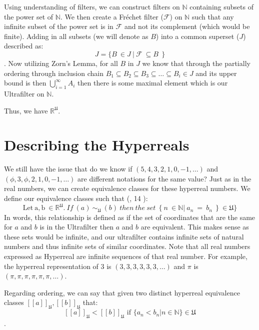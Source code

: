 \documentclass[12pt]{report}
\newcommand{\R}{\mathbb{R}}
\newcommand{\N}{\mathbb{N}}
\newcommand{\U}{\mathfrak{U}}
\begin{document}
Using understanding of filters, we can construct filters on $\N$ containing subsets of the power set of $\N$.
We then create a Fr\'echet filter ($\mathcal{F}$) on $\N$ such that any infinite subset of the power set is in $\mathcal{F}$ and not its complement (which would be finite).
Adding in all subsets (we will denote as $B$) into a common superset ($J$) described as:\[J=\{B\ \in J\ |\ \mathcal{F}\ \subseteq B\ \ \}\].
Now utilizing Zorn's Lemma, for all $B$ in $J$ we know that through the partially ordering through inclusion chain $B_1\subseteq B_2\subseteq B_3\subseteq\ldots\subseteq B_i\in J $ and its upper bound is then $\bigcup_{i=1}^{\infty}A_i$ then there is some maximal element which is our Ultrafilter on $\N$.

Thus, we have $\R^{\mathfrak{U}} $.


\chapter{ Describing the Hyperreals}
We still have the issue that do we know if $(5,4,3,2,1,0,-1,\ldots)$ and $(\phi,3,\phi, 2,1,0,-1,\ldots)$ are different notations for the same value?
Just as in the real numbers, we can create equivalence classes for these hyperreal numbers.
We define our equivalence classes such that (, 14 ):
\[\mathrm{Let\ a,b\ \in \R^{\U}}.\ If\ (a)\ \sim_{\U}\ (b)\ then\ the\ set\ \ \{\ n\ \in \N|\ a_{n}\ =\ b_{n}\ \ \}\ \in \U \}\]
In words, this relationship is defined as if the set of coordinates that are the same for $a$ and $b$ is in the Ultrafilter then $a$ and $b$ are equivalent.
This makes sense as these sets would be infinite, and our ultrafilter contains infinite sets of natural numbers and thus infinite sets of similar coordinates.
Note that all real numbers expressed as Hyperreal are infinite sequences of that real number.
For example, the hyperreal representation of 3 is $(3,3,3,3,3, 3, \ldots)$ and $\pi$ is $(\pi, \pi, \pi,\pi, \pi, \pi, \ldots)$.

Regarding ordering, we can say that given two distinct hyperreal equivalence classes $  [[a]]_{\U}, [[b]]_{\U}$  that: \[ [[a]]_{\U}< [[b]]_{\U} \text{ if }\{a_n < b_n | n \in \N \} \in \U \].
\end{document}

